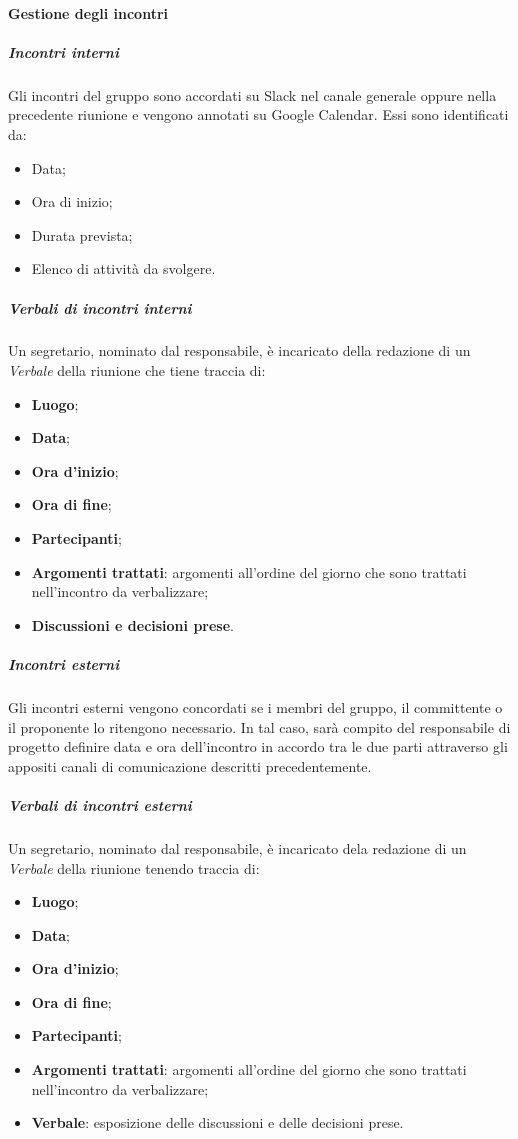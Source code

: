 			\paragraph{Gestione degli incontri}
				\subparagraph*{Incontri interni}
					Gli incontri del gruppo sono accordati su Slack nel canale generale oppure nella precedente riunione e vengono annotati su Google Calendar. Essi sono identificati da:
					\begin{itemize}
						\item Data;
						\item Ora di inizio;
						\item Durata prevista;
						\item Elenco di attività da svolgere.
					\end{itemize}
				\subparagraph*{Verbali di incontri interni}
					Un segretario, nominato dal responsabile, è incaricato della redazione di un \textit{Verbale} della riunione che tiene traccia di:
					\begin{itemize}
						\item \textbf{Luogo};
						\item \textbf{Data};
						\item \textbf{Ora d'inizio};
						\item \textbf{Ora di fine};
						\item \textbf{Partecipanti};
						\item \textbf{Argomenti trattati}: argomenti all'ordine del giorno che sono trattati nell'incontro da verbalizzare;
						\item \textbf{Discussioni e decisioni prese}.
					\end{itemize}
				\subparagraph*{Incontri esterni}
					Gli incontri esterni vengono concordati se i membri del gruppo, il committente o il proponente lo ritengono necessario. In tal caso, sarà compito del responsabile di progetto definire data e ora dell'incontro in accordo tra le due parti attraverso gli appositi canali di comunicazione descritti precedentemente.
				\subparagraph{Verbali di incontri esterni}
					Un segretario, nominato dal responsabile, è incaricato dela redazione di un \textit{Verbale} della riunione tenendo traccia di:
					\begin{itemize}
						\item \textbf{Luogo};
						\item \textbf{Data};
						\item \textbf{Ora d'inizio};
						\item \textbf{Ora di fine};
						\item \textbf{Partecipanti};
						\item \textbf{Argomenti trattati}: argomenti all'ordine del giorno che sono trattati nell'incontro da verbalizzare;
						\item \textbf{Verbale}: esposizione delle discussioni e delle decisioni prese.
					\end{itemize}
